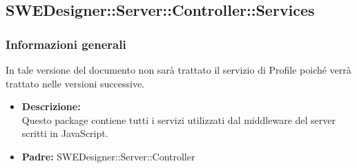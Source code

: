   \subsection{SWEDesigner::Server::Controller::Services}
    \subsubsection{Informazioni generali}
      In tale versione del documento non sarà trattato il servizio di Profile poiché verrà trattato nelle versioni successive.
      \begin{itemize}
        \item \textbf{Descrizione: }\\
        Questo package contiene tutti i servizi utilizzati dal middleware del server scritti in JavaScript.
        \item \textbf{Padre: }SWEDesigner::Server::Controller
      \end{itemize}
